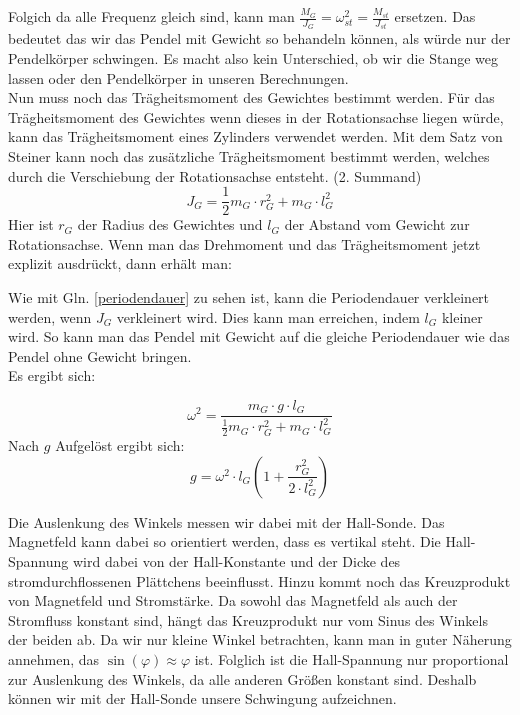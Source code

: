 \documentclass[twoside]{protokoll}
\begin{document}
Folgich da alle Frequenz gleich sind, kann man $\frac{M_G}{J_G} = \omega_{st}^2 = \frac{M_{st}}{J_{st}}$ ersetzen.
Das bedeutet das wir das Pendel mit Gewicht so behandeln können, als würde nur der Pendelkörper schwingen. 
Es macht also kein Unterschied, ob wir die Stange weg lassen oder den Pendelkörper in unseren Berechnungen. \\
Nun muss noch das Trägheitsmoment des Gewichtes bestimmt werden.
Für das Trägheitsmoment des Gewichtes wenn dieses in der Rotationsachse liegen würde, kann das Trägheitsmoment eines Zylinders verwendet werden.
Mit dem Satz von Steiner kann noch das zusätzliche Trägheitsmoment bestimmt werden, welches durch die Verschiebung der Rotationsachse entsteht. (2. Summand)
\begin{equation}
    J_G = \frac{1}{2} m_G \cdot r_G^2 + m_G \cdot l_G^2
\end{equation}
Hier ist $r_G$ der Radius des Gewichtes und $l_G$ der Abstand vom Gewicht zur Rotationsachse.
Wenn man das Drehmoment und das Trägheitsmoment jetzt explizit ausdrückt, dann erhält man:
 
Wie mit Gln. \ref{periodendauer} zu sehen ist, kann die Periodendauer verkleinert werden, wenn $J_G$ verkleinert wird.
Dies kann man erreichen, indem $l_G$ kleiner wird. So kann man das Pendel mit Gewicht auf die gleiche Periodendauer wie das Pendel ohne Gewicht bringen. \\

Es ergibt sich:
 
\begin{equation}
    \omega^2 = \frac{m_G \cdot g \cdot l_G}{\frac{1}{2} m_G \cdot r_G^2 + m_G \cdot l_G^2}
\end{equation}
Nach $g$ Aufgelöst ergibt sich:
\begin{equation}
    g = \omega^2 \cdot l_G \left( 1 + \frac{r_G^2}{2 \cdot l_G^2} \right)
    \label{eq:pendel}
\end{equation}


Die Auslenkung des Winkels messen wir dabei mit der Hall-Sonde.
Das Magnetfeld kann dabei so orientiert werden, dass es vertikal steht.
Die Hall-Spannung wird dabei von der Hall-Konstante und  der Dicke des stromdurchflossenen Plättchens beeinflusst.
Hinzu kommt noch das Kreuzprodukt von Magnetfeld und Stromstärke. Da sowohl das Magnetfeld als auch der Stromfluss konstant sind, hängt das Kreuzprodukt nur vom Sinus des Winkels der beiden ab.
Da wir nur kleine Winkel betrachten, kann man in guter Näherung annehmen, das $\sin(\varphi) \approx \varphi$ ist.
Folglich ist die Hall-Spannung nur proportional zur Auslenkung des Winkels, da alle anderen Größen konstant sind.
Deshalb können wir mit der Hall-Sonde unsere Schwingung aufzeichnen.
\end{document}
